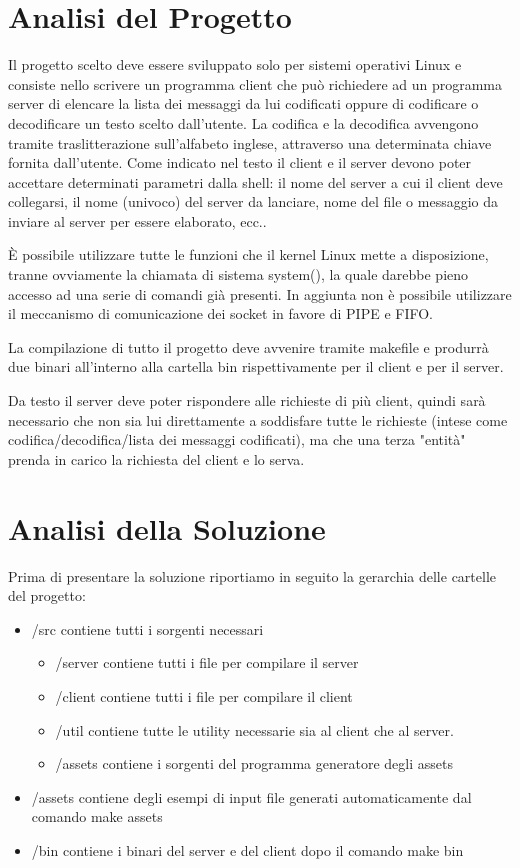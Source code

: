 \documentclass[12pt]{article}
\begin{document}


\section{Analisi del Progetto}
Il progetto scelto deve essere sviluppato solo per sistemi operativi Linux e consiste nello scrivere un programma client che può richiedere ad un programma server di elencare la lista dei messaggi da lui codificati oppure di codificare o decodificare un testo scelto dall'utente. La codifica e la decodifica avvengono tramite traslitterazione sull'alfabeto inglese, attraverso una determinata chiave fornita dall'utente. Come indicato nel testo il client e il server devono poter accettare determinati parametri dalla shell: il nome del server a cui il client deve collegarsi, il nome (univoco) del server da lanciare, nome del file o messaggio da inviare al server per essere elaborato, ecc..

È possibile utilizzare tutte le funzioni che il kernel Linux mette a disposizione, tranne ovviamente la chiamata di sistema system(), la quale darebbe pieno accesso ad una serie di comandi già presenti. In aggiunta non è possibile utilizzare il meccanismo di comunicazione dei socket in favore di PIPE e FIFO.

La compilazione di tutto il progetto deve avvenire tramite makefile e produrrà due binari all'interno alla cartella bin rispettivamente per il client e per il server.

Da testo il server deve poter rispondere alle richieste di più client, quindi sarà necessario che non sia lui direttamente a soddisfare tutte le richieste (intese come codifica/decodifica/lista dei messaggi codificati), ma che una terza "entità" prenda in carico la richiesta del client e lo serva.
\vspace*{1cm}

\section{Analisi della Soluzione}
Prima di presentare la soluzione riportiamo in seguito la gerarchia delle cartelle del progetto:
\begin{itemize}
    \item /src contiene tutti i sorgenti necessari
    \begin{itemize}
        \item /server contiene tutti i file per compilare il server
        \item /client contiene tutti i file per compilare il client
        \item /util contiene tutte le utility necessarie sia al client che al server.
        \item /assets contiene i sorgenti del programma generatore degli assets
    \end{itemize}
    \item /assets contiene degli esempi di input file generati automaticamente dal comando make assets
    \item /bin contiene i binari del server e del client dopo il comando make bin
\end{itemize}
\end{document}

